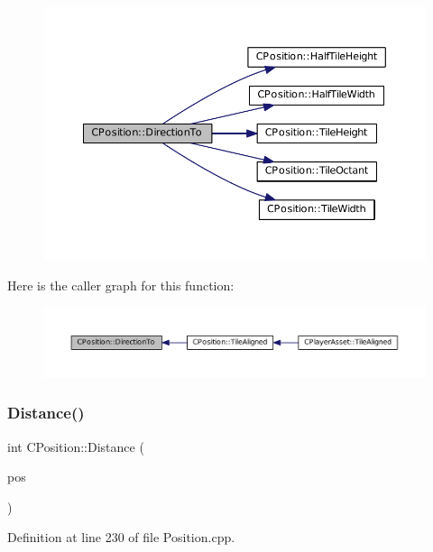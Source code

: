 \begin{figure}[H]
\begin{center}
\leavevmode
\includegraphics[width=350pt]{classCPosition_a65124e3543c2d2e284e5eb517cd7f842_cgraph}
\end{center}
\end{figure}
Here is the caller graph for this function\+:\nopagebreak
\begin{figure}[H]
\begin{center}
\leavevmode
\includegraphics[width=350pt]{classCPosition_a65124e3543c2d2e284e5eb517cd7f842_icgraph}
\end{center}
\end{figure}
\hypertarget{classCPosition_a9edc6690c78a54ea08b137df83c22e91}{}\label{classCPosition_a9edc6690c78a54ea08b137df83c22e91} 
\subsubsection{\texorpdfstring{Distance()}{Distance()}}
{\footnotesize\ttfamily int C\+Position\+::\+Distance (\begin{DoxyParamCaption}\item[{const \hyperlink{classCPosition}{C\+Position} \&}]{pos }\end{DoxyParamCaption})}



Definition at line 230 of file Position.\+cpp.



